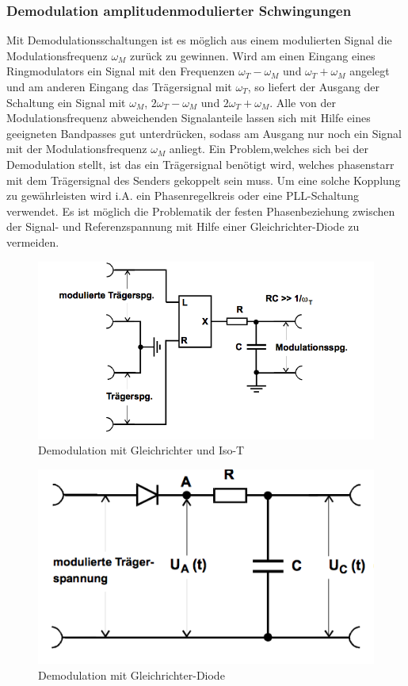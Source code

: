\subsubsection{Demodulation amplitudenmodulierter Schwingungen}
Mit Demodulationsschaltungen ist es möglich aus einem modulierten Signal die Modulationsfrequenz $\omega_M$ zurück zu gewinnen.
Wird am einen Eingang eines Ringmodulators ein Signal mit den Frequenzen $\omega_T - \omega_M$ und $\omega_T + \omega_M$ angelegt und am anderen Eingang das Trägersignal mit $\omega_T$, so liefert der Ausgang der Schaltung ein Signal mit
$\omega_M$, $2\omega_T - \omega_M$ und $2\omega_T + \omega_M$. Alle von der Modulationsfrequenz abweichenden Signalanteile lassen sich mit Hilfe eines geeigneten Bandpasses gut unterdrücken, sodass am Ausgang nur noch ein Signal mit der Modulationsfrequenz $\omega_M$ anliegt. Ein Problem,welches sich bei der Demodulation stellt, ist das ein Trägersignal benötigt wird, welches phasenstarr mit dem Trägersignal des Senders gekoppelt sein muss. Um eine solche Kopplung zu gewährleisten wird i.A. ein Phasenregelkreis oder eine PLL-Schaltung verwendet. 
Es ist möglich die Problematik der festen Phasenbeziehung zwischen der Signal- und Referenzspannung mit Hilfe einer Gleichrichter-Diode 
zu vermeiden.

\begin{figure}
	\centering
	\includegraphics[width=\textwidth]{img/Abb8.png}
	\caption{Demodulation mit Gleichrichter und Iso-T \cite{FP}}
	\label{iso-t}
\end{figure}

\begin{figure}
	\centering
	\includegraphics[width=\textwidth]{img/Abb9.png}
	\caption{Demodulation mit Gleichrichter-Diode \cite{FP}}
	\label{fig:9}
\end{figure}

